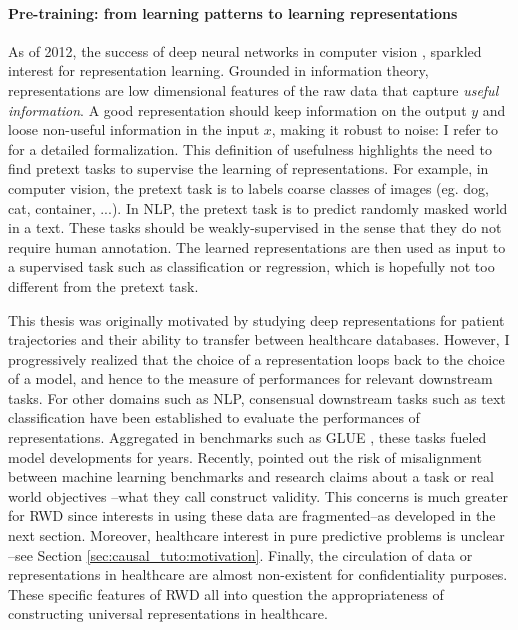 \documentclass[french,12pt,twoside,a4paper]{book}
\begin{document}
\begin{background_box_left}

  \paragraph{Pre-training: from learning patterns to learning representations}
  As of 2012, the success of deep neural networks in computer vision
  \citep{krizhevsky2012imagenet}, sparkled interest for representation learning.
  Grounded in information theory, representations are low dimensional features
  of the raw data that capture \emph{useful information}. A good representation
  should keep information on the output $y$ and loose non-useful information in
  the input $x$, making it robust to noise: I refer to
  \cite{achille2018emergence} for a detailed formalization. This definition of
  usefulness highlights the need to find pretext tasks to supervise the learning
  of representations. For example, in computer vision, the pretext task is to
  labels coarse classes of images (eg. dog, cat, container, ...). In NLP, the
  pretext task is to predict randomly masked world in a text. These tasks should
  be weakly-supervised in the sense that they do not require human annotation.
  The learned representations are then used as input to a supervised task such
  as classification or regression, which is hopefully not too different from the
  pretext task. 

  This thesis was originally motivated by studying deep representations for
  patient trajectories and their ability to transfer between healthcare
  databases. However, I progressively realized that the choice of a
  representation loops back to the choice of a model, and hence to the measure
  of performances for relevant downstream tasks. For other domains such as NLP,
  consensual downstream tasks such as text classification have been established
  to evaluate the performances of representations. Aggregated in
  benchmarks such as GLUE \citep{wang2018glue}, these tasks fueled model
  developments for years. Recently, \cite{raji2021ai} pointed out the risk of
  misalignment between machine learning benchmarks and research claims about a
  task or real world objectives --what they call construct validity. This
  concerns is much greater for RWD since interests in using these data are
  fragmented--as developed in the next section. Moreover, healthcare interest in
  pure predictive problems is unclear --see Section
  \ref{sec:causal_tuto:motivation}. Finally, the circulation of data or
  representations in healthcare are almost non-existent for confidentiality
  purposes. These specific features of RWD all into question the appropriateness
  of constructing universal representations in healthcare.


\end{background_box_left}
\end{document}
